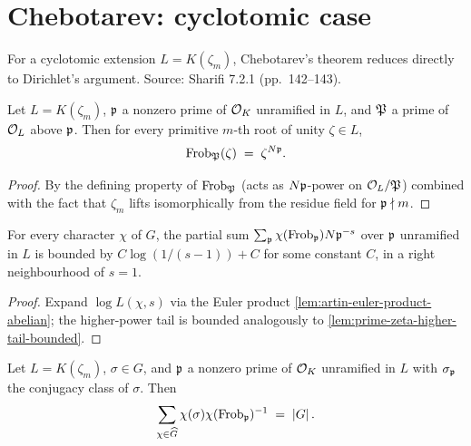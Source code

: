 \section{Chebotarev: cyclotomic case}

For a cyclotomic extension $L = K(\zeta_m)$, Chebotarev's theorem
reduces directly to Dirichlet's argument. Source: Sharifi 7.2.1
(pp.~142--143).

\begin{lemma}\label{lem:cyclotomic-frobenius-norm-power}
  Let $L = K(\zeta_m)$, $\mathfrak{p}$ a nonzero prime of $\mathcal{O}_K$ unramified in
  $L$, and $\mathfrak{P}$ a prime of $\mathcal{O}_L$ above $\mathfrak{p}$. Then for every
  primitive $m$-th root of unity $\zeta \in L$,
  \[
    \mathrm{Frob}_{\mathfrak{P}}(\zeta) \;=\; \zeta^{N\mathfrak{p}}.
  \]
\end{lemma}

\begin{proof}
  By the defining property of $\mathrm{Frob}_{\mathfrak{P}}$ (acts as $N\mathfrak{p}$-power on
  $\mathcal{O}_L/\mathfrak{P}$) combined with the fact that $\zeta_m$ lifts
  isomorphically from the residue field for $\mathfrak{p}\nmid m$.
\end{proof}

\begin{lemma}\label{lem:log-artin-asymp-character-sum}
  For every character $\chi$ of $G$, the partial sum
  $\sum_{\mathfrak{p}} \chi(\mathrm{Frob}_{\mathfrak{p}}) N\mathfrak{p}^{-s}$ over $\mathfrak{p}$ unramified in $L$ is
  bounded by $C\log(1/(s-1)) + C$ for some constant $C$, in a right
  neighbourhood of $s = 1$.
\end{lemma}

\begin{proof}
  Expand $\log L(\chi, s)$ via the Euler product
  \cref{lem:artin-euler-product-abelian}; the higher-power tail is
  bounded analogously to \cref{lem:prime-zeta-higher-tail-bounded}.
\end{proof}

\begin{lemma}\label{lem:character-orthogonality-eq}
  Let $L = K(\zeta_m)$, $\sigma \in G$, and $\mathfrak{p}$ a nonzero prime of
  $\mathcal{O}_K$ unramified in $L$ with $\sigma_{\mathfrak{p}}$ the conjugacy class of
  $\sigma$. Then
  \[
    \sum_{\chi\in\widehat G} \chi(\sigma)\chi(\mathrm{Frob}_{\mathfrak{p}})^{-1}
    \;=\; \left\lvert G \right\rvert.
  \]
\end{lemma}

